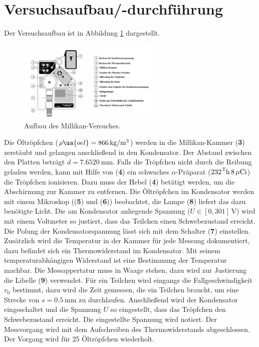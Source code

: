 \section{Versuchsaufbau/-durchführung}

Der Versuchsaufbau ist in Abbildung \ref{fig: versuchsaufabu} dargestellt.
\begin{figure}
  \centering
  \includegraphics[width=0.6\textwidth]{pics/aufbau.png}
  \caption{Aufbau des Millikan-Versuches\cite{anleitung503}.}
  \label{fig: versuchsaufabu}
  \end{figure}
Die Öltröpfchen ($\rho\ua{oel}=\SI{866}{\kilogram\per\cubic\meter}$) werden in die Millikan-Kammer (\textbf{3}) zerstäubt
und gelangen anschließend in den Kondensator. Der Abstand zwischen den Platten beträgt $d=\SI{7.6520}{\milli\meter}$.
Falls die Tröpfchen nicht durch die
Reibung geladen werden, kann mit Hilfe von (\textbf{4}) ein schwaches
$\alpha$-Präparat ($\ce{{232}^Th}\,8\,\mu\ce{Ci}$) die Tröpfchen ionisieren. Dazu
muss der Hebel (\textbf{4}) betätigt werden, um die Abschirmung zur Kammer
zu entfernen.
Die Öltröpfchen im Kondensator werden mit einem Mikroskop ((\textbf{5}) und (\textbf{6})) beobachtet,
die Lampe (\textbf{8}) liefert das dazu benötigte Licht.
Die am Kondensator anliegende Spannung ($U\in\left[0,301\right]\,\si{\volt}$) %
wird mit einem Voltmeter so justiert, dass das Teilchen einen Schwebezustand erreicht. %
Die Polung der Kondensatorspannung lässt sich mit dem Schalter (\textbf{7}) einstellen.
Zusätzlich wird die Temperatur in der Kammer für jede Messung dokumentiert, dazu befindet sich
ein Thermowiderstand im Kondensator. Mit seinem temperaturabhängigen Widerstand ist eine Bestimmung
der Temperatur machbar. %
Die Messappertatur muss in Waage stehen, dazu wird zur Justierung die %
Libelle (\textbf{9}) verwendet.
Für ein Teilchen wird eingangs die Fallgeschwindigkeit $v_0$ bestimmt, dazu
wird die Zeit gemessen, die ein Teilchen braucht, um eine Strecke von $s=\SI{0.5}{\milli\meter}$
zu durchlaufen. Anschließend wird der Kondensator eingeschaltet und die Spannung
$U$ so eingestellt, dass das Tröpfchen den Schwebezustand erreicht. Die eingestellte %
Spannung wird notiert. Der Messvorgang wird mit dem Aufschreiben des Thermowiderstands %
abgeschlossen. Der Vorgang wird für 25 Öltröpfchen wiederholt.
